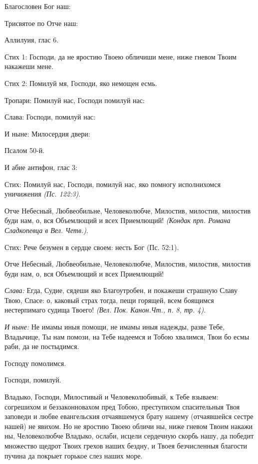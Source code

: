 \begin{mymulticols}

Благословен Бог наш:

Трисвятое по Отче наш:

Аллилуия, глас 6.

Стих 1: Господи, да не яростию Твоею обличиши мене, ниже гневом Твоим накажеши мене. 

Стих 2: Помилуй мя, Господи, яко немощен есмь.

Тропари: Помилуй нас, Господи помилуй нас:

Слава: Господи, помилуй нас:

И ныне: Милосердия двери:

Псалом 50-й.

И абие антифон, глас 3:

Стих: Помилуй нас, Господи, помилуй нас, яко помногу исполнихомся уничижения {\itshape (Пс. 122:3)}.

Отче Небесный, Любвеобильне, Человеколюбче, Милостив, милостив, милостив буди нам, о, вся Объемлющий и всех Приемлющий! {\itshape (Кондак прп. Романа Сладкопевца в Вел. Четв.)}.

Стих: Рече безумен в сердце своем: несть Бог (Пс. 52:1).

Отче Небесный, Любвеобильне, Человеколюбче, Милостив, милостив, милостив буди нам, о, вся Объемлющий и всех Приемлющий!

\emph{Слава:}
Егда, Судие, сядеши яко Благоутробен, и покажеши страшную Славу Твою, Спасе: о, каковый страх тогда, пещи горящей, всем боящимся нестерпимаго судища Твоего! {\itshape (Вел. Пок. Канон.Чт., п. 8, тр. 4)}.

\emph{И ныне:}
Не имамы иныя помощи, не имамы иныя надежды, разве Тебе, Владычице, Ты нам помози, на Тебе надеемся и Тобою хвалимся, Твои бо есмы раби, да не постыдимся.

Господу помолимся.

Господи, помилуй.


Владыко, Господи, Милостивый и Человеколюбивый, к Тебе взываем: согрешихом и беззаконновахом пред Тобою, преступихом спасительныя Твоя заповеди и любве евангельския отчаявшемуся брату нашему (отчаявшейся сестре нашей) не явихом. Но не яростию Твоею обличи ны, ниже гневом Твоим накажи ны, Человеколюбче Владыко, ослаби, исцели сердечную скорбь нашу, да победит множество щедрот Твоих грехов наших бездну, и Твоея безчисленныя благости пучина да покрыет горькое слез наших море.


\end{mymulticols}
